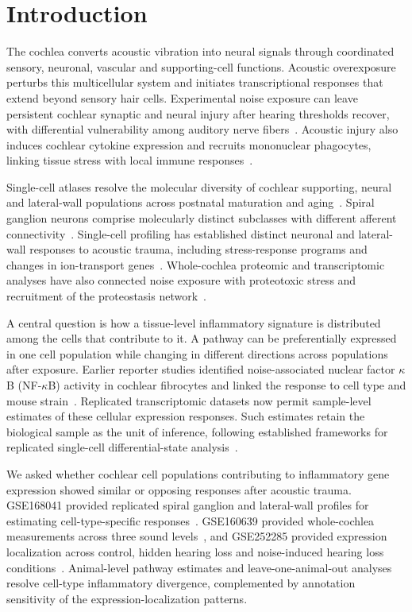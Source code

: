 \section{Introduction}

The cochlea converts acoustic vibration into neural signals through coordinated sensory, neuronal, vascular and supporting-cell functions. Acoustic overexposure perturbs this multicellular system and initiates transcriptional responses that extend beyond sensory hair cells. Experimental noise exposure can leave persistent cochlear synaptic and neural injury after hearing thresholds recover, with differential vulnerability among auditory nerve fibers~\citep{Kujawa2009,Furman2013}. Acoustic injury also induces cochlear cytokine expression and recruits mononuclear phagocytes, linking tissue stress with local immune responses~\citep{Fujioka2006,Hirose2005}.

Single-cell atlases resolve the molecular diversity of cochlear supporting, neural and lateral-wall populations across postnatal maturation and aging~\citep{Jean2023,Sun2023}. Spiral ganglion neurons comprise molecularly distinct subclasses with different afferent connectivity~\citep{Petitpre2018}. Single-cell profiling has established distinct neuronal and lateral-wall responses to acoustic trauma, including stress-response programs and changes in ion-transport genes~\citep{Milon2021}. Whole-cochlea proteomic and transcriptomic analyses have also connected noise exposure with proteotoxic stress and recruitment of the proteostasis network~\citep{Jongkamonwiwat2020}.

A central question is how a tissue-level inflammatory signature is distributed among the cells that contribute to it. A pathway can be preferentially expressed in one cell population while changing in different directions across populations after exposure. Earlier reporter studies identified noise-associated nuclear factor \(\kappa\)B (NF-\(\kappa\)B) activity in cochlear fibrocytes and linked the response to cell type and mouse strain~\citep{Adams2009,Herranen2018}. Replicated transcriptomic datasets now permit sample-level estimates of these cellular expression responses. Such estimates retain the biological sample as the unit of inference, following established frameworks for replicated single-cell differential-state analysis~\citep{Crowell2020,Squair2021}.

We asked whether cochlear cell populations contributing to inflammatory gene expression showed similar or opposing responses after acoustic trauma. GSE168041 provided replicated spiral ganglion and lateral-wall profiles for estimating cell-type-specific responses~\citep{Milon2021}. GSE160639 provided whole-cochlea measurements across three sound levels~\citep{Jongkamonwiwat2020}, and GSE252285 provided expression localization across control, hidden hearing loss and noise-induced hearing loss conditions~\citep{GSE252285}. Animal-level pathway estimates and leave-one-animal-out analyses resolve cell-type inflammatory divergence, complemented by annotation sensitivity of the expression-localization patterns.
